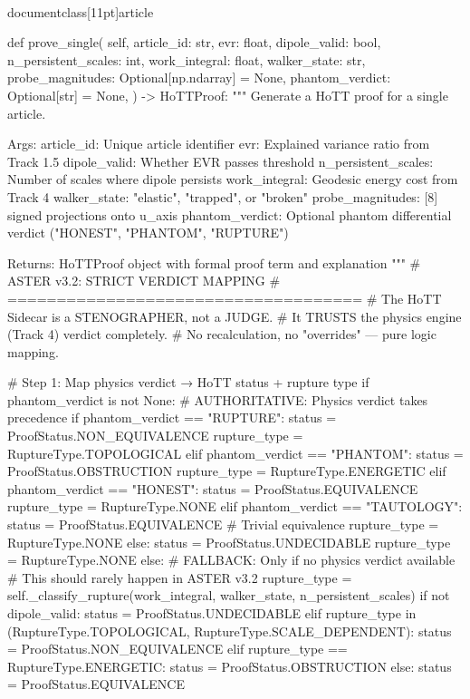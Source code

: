 \\documentclass[11pt]{article}
\begin{document}
\begin{CodeBlock}
    def prove_single(
        self,
        article_id: str,
        evr: float,
        dipole_valid: bool,
        n_persistent_scales: int,
        work_integral: float,
        walker_state: str,
        probe_magnitudes: Optional[np.ndarray] = None,
        phantom_verdict: Optional[str] = None,
    ) -> HoTTProof:
        """
        Generate a HoTT proof for a single article.

        Args:
            article_id: Unique article identifier
            evr: Explained variance ratio from Track 1.5
            dipole_valid: Whether EVR passes threshold
            n_persistent_scales: Number of scales where dipole persists
            work_integral: Geodesic energy cost from Track 4
            walker_state: "elastic", "trapped", or "broken"
            probe_magnitudes: [8] signed projections onto u_axis
            phantom_verdict: Optional phantom differential verdict ("HONEST", "PHANTOM", "RUPTURE")

        Returns:
            HoTTProof object with formal proof term and explanation
        """
        # ASTER v3.2: STRICT VERDICT MAPPING
        # ====================================
        # The HoTT Sidecar is a STENOGRAPHER, not a JUDGE.
        # It TRUSTS the physics engine (Track 4) verdict completely.
        # No recalculation, no "overrides" — pure logic mapping.

        # Step 1: Map physics verdict → HoTT status + rupture type
        if phantom_verdict is not None:
            # AUTHORITATIVE: Physics verdict takes precedence
            if phantom_verdict == "RUPTURE":
                status = ProofStatus.NON_EQUIVALENCE
                rupture_type = RuptureType.TOPOLOGICAL
            elif phantom_verdict == "PHANTOM":
                status = ProofStatus.OBSTRUCTION
                rupture_type = RuptureType.ENERGETIC
            elif phantom_verdict == "HONEST":
                status = ProofStatus.EQUIVALENCE
                rupture_type = RuptureType.NONE
            elif phantom_verdict == "TAUTOLOGY":
                status = ProofStatus.EQUIVALENCE  # Trivial equivalence
                rupture_type = RuptureType.NONE
            else:
                status = ProofStatus.UNDECIDABLE
                rupture_type = RuptureType.NONE
        else:
            # FALLBACK: Only if no physics verdict available
            # This should rarely happen in ASTER v3.2
            rupture_type = self._classify_rupture(work_integral, walker_state, n_persistent_scales)
            if not dipole_valid:
                status = ProofStatus.UNDECIDABLE
            elif rupture_type in (RuptureType.TOPOLOGICAL, RuptureType.SCALE_DEPENDENT):
                status = ProofStatus.NON_EQUIVALENCE
            elif rupture_type == RuptureType.ENERGETIC:
                status = ProofStatus.OBSTRUCTION
            else:
                status = ProofStatus.EQUIVALENCE


\end{CodeBlock}
\end{document}
